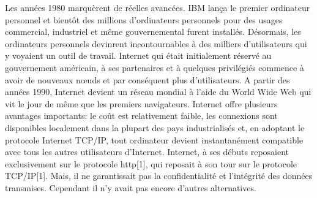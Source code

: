 Les années 1980 marquèrent de réelles avancées. IBM lança le premier ordinateur personnel et bientôt des millions d’ordinateurs personnels pour des usages commercial, industriel et même gouvernemental furent installés. Désormais, les ordinateurs personnels devinrent incontournables à des milliers d’utilisateurs qui y voyaient un outil de travail.
Internet qui était initialement réservé au gouvernement américain, à ses partenaires et à quelques privilégiés commence à avoir de nouveaux nœuds et par conséquent plus d’utilisateurs. 
A partir des années 1990, Internet devient un réseau mondial à l’aide du World Wide Web qui vit le jour de même que les premiers navigateurs. Internet offre plusieurs avantages importants: le coût est relativement faible, les connexions sont disponibles localement dans la plupart des pays industrialisés et, en adoptant le protocole Internet TCP/IP, tout ordinateur devient instantanément compatible avec tous les autres utilisateurs d'Internet. 
Internet, à ses débuts reposaient exclusivement sur le protocole http[1], qui reposait à son tour sur le protocole TCP/IP[1]. Mais, il ne garantissait pas la confidentialité et l’intégrité des données transmises. Cependant il n’y avait pas encore d’autres alternatives.


